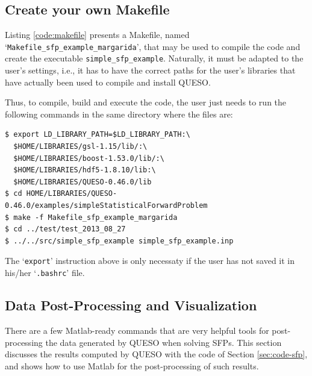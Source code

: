 



\subsection{Create your own Makefile}\label{sec:sfp-makefile}

 
Listing \ref{code:makefile} presents a Makefile, named `\texttt{Makefile\_sfp\_example\_margarida}', that may be used to compile the code and create the executable \verb+simple_sfp_example+. Naturally, it must be adapted to the user's settings, i.e., it has to have the correct paths for the user's libraries that have actually been used to compile and install QUESO.



Thus, to compile, build and execute the code, the user just needs to run the following commands in the same directory where the files are:
\begin{lstlisting}
$ export LD_LIBRARY_PATH=$LD_LIBRARY_PATH:\
  $HOME/LIBRARIES/gsl-1.15/lib/:\
  $HOME/LIBRARIES/boost-1.53.0/lib/:\
  $HOME/LIBRARIES/hdf5-1.8.10/lib:\
  $HOME/LIBRARIES/QUESO-0.46.0/lib 
$ cd HOME/LIBRARIES/QUESO-0.46.0/examples/simpleStatisticalForwardProblem 
$ make -f Makefile_sfp_example_margarida 
$ cd ../test/test_2013_08_27
$ ../../src/simple_sfp_example simple_sfp_example.inp
\end{lstlisting}

The `\verb+export+' instruction above is only necessaty if the user has not saved it in his/her `\verb+.bashrc+' file.


\subsection{Data Post-Processing and Visualization}\label{sec:sfp-results}


There are a few Matlab-ready commands that are very helpful tools for post-processing the data generated by QUESO when solving SFPs. This section discusses the results computed by QUESO with the code of Section \ref{sec:code-sfp}, and shows how to use Matlab for the post-processing of such results. 

